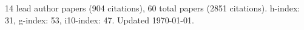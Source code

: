 14 lead author papers (904 citations),
60 total papers (2851 citations).\newline
h-index: 31, g-index: 53, i10-index: 47. Updated \today.
